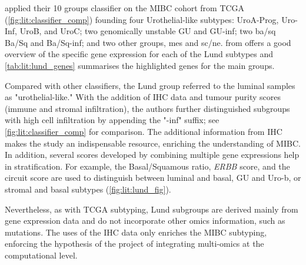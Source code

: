 \citeauthor{Marzouka2018-ge} applied their 10 groups classifier on the MIBC cohort from TCGA (\cref{fig:lit:classifier_comp}) founding four Urothelial-like subtypes: UroA-Prog, Uro-Inf, UroB, and UroC; two genomically unstable GU and GU-inf; two \acrfull{ba/sq}  Ba/Sq and Ba/Sq-inf; and two other groups, \acrfull{mes} and \acrfull{sc/ne}.  from \citet{Marzouka2018-ge} offers a good overview of the specific gene expression for each of the Lund subtypes and \cref{tab:lit:lund_genes} summarises the highlighted genes for the main groups.

Compared with other classifiers, the Lund group referred to the luminal samples as "urothelial-like." With the addition of IHC data and tumour purity scores (immune and stromal infiltration), the authors further distinguished subgroups with high cell infiltration by appending the "-inf" suffix; see \cref{fig:lit:classifier_comp} for comparison. The additional information from IHC makes the study an indispensable resource, enriching the understanding of MIBC. In addition, several scores developed by combining multiple gene expressions help in stratification. For example, the Basal/Squamous ratio, \textit{ERBB} score, and the circuit score are used to distinguish between luminal and basal, GU and Uro-b, or stromal and basal subtypes (\cref{fig:lit:lund_fig}).

Nevertheless, as with TCGA subtyping, Lund subgroups are derived mainly from gene expression data and do not incorporate other omics information, such as mutations. The uses of the IHC data only enriches the MIBC subtyping, enforcing the hypothesis of the project of integrating multi-omics at the computational level.

